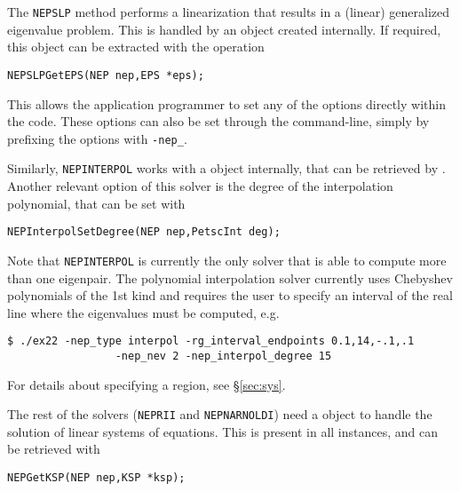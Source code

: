 The \texttt{NEPSLP} method performs a linearization that results in a (linear) generalized eigenvalue problem. This is handled by an  object created internally. If required, this  object can be extracted with the operation
	\begin{Verbatim}[fontsize=\small]
	NEPSLPGetEPS(NEP nep,EPS *eps);
	\end{Verbatim}
This allows the application programmer to set any of the  options directly within the code. These options can also be set through the command-line, simply by prefixing the  options with \texttt{-nep\_}.

Similarly, \texttt{NEPINTERPOL} works with a  object internally, that can be retrieved by . Another relevant option of this solver is the degree of the interpolation polynomial, that can be set with
	\begin{Verbatim}[fontsize=\small]
	NEPInterpolSetDegree(NEP nep,PetscInt deg);
	\end{Verbatim}
Note that \texttt{NEPINTERPOL} is currently the only  solver that is able to compute more than one eigenpair.
The polynomial interpolation solver currently uses Chebyshev polynomials of the 1st kind and requires the user to specify an interval of the real line where the eigenvalues must be computed, e.g.
\begin{Verbatim}[fontsize=\small]
	$ ./ex22 -nep_type interpol -rg_interval_endpoints 0.1,14,-.1,.1
                 -nep_nev 2 -nep_interpol_degree 15
\end{Verbatim}
For details about specifying a region, see \S\ref{sec:sys}.

The rest of the  solvers (\texttt{NEPRII} and \texttt{NEPNARNOLDI}) need a  object to handle the solution of linear systems of equations. This  is present in all  instances, and can be retrieved with
	\begin{Verbatim}[fontsize=\small]
	NEPGetKSP(NEP nep,KSP *ksp);
	\end{Verbatim}

